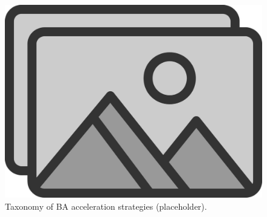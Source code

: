 \begin{figure}[t]
  \centering
  \includegraphics[width=0.85\linewidth]{figs/placeholder}
  \caption{Taxonomy of BA acceleration strategies (placeholder).}
  \label{fig:rw_taxonomy}
\end{figure}

